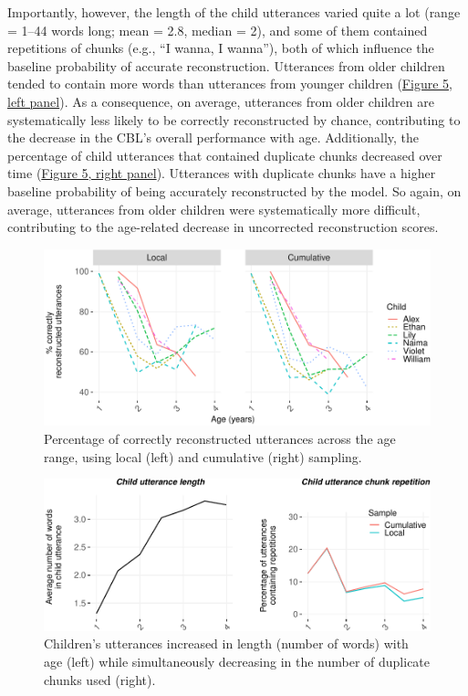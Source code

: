 \documentclass[man,mask,floatsintext]{apa6}
\begin{document}
Importantly, however, the length of the child utterances varied quite a
lot (range = 1--44 words long; mean = 2.8, median = 2), and some of them
contained repetitions of chunks (e.g., \enquote{I wanna, I wanna}), both
of which influence the baseline probability of accurate reconstruction.
Utterances from older children tended to contain more words than
utterances from younger children (\protect\hyperlink{fig5}{Figure 5,
left panel}). As a consequence, on average, utterances from older
children are systematically less likely to be correctly reconstructed by
chance, contributing to the decrease in the CBL's overall performance
with age. Additionally, the percentage of child utterances that
contained duplicate chunks decreased over time
(\protect\hyperlink{fig5}{Figure 5, right panel}). Utterances with
duplicate chunks have a higher baseline probability of being accurately
reconstructed by the model. So again, on average, utterances from older
children were systematically more difficult, contributing to the
age-related decrease in uncorrected reconstruction scores.

\begin{figure}
\includegraphics[width=0.95\linewidth]{CBL-age_invariance_files/figure-latex/fig4-1} \caption{Percentage of correctly reconstructed utterances across the age range, using local (left) and cumulative (right) sampling.}\label{fig:fig4}
\end{figure}

\begin{figure}
\includegraphics[width=0.95\linewidth]{CBL-age_invariance_files/figure-latex/fig5-1} \caption{Children's utterances increased in length (number of words) with age (left) while simultaneously decreasing in the number of duplicate chunks used (right).}\label{fig:fig5}
\end{figure}
\end{document}
